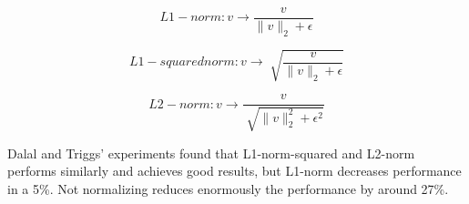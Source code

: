 \begin{equation}\label{eq:L1-norm}
L1-norm: v\rightarrow \frac{v}{    \|v\|_2 + \epsilon}
\end{equation}

\begin{equation}\label{eq:L1-squared}
L1-squared norm: v\rightarrow \sqrt[]{\frac{v}{    \|v\|_2 + \epsilon}}
\end{equation}

\begin{equation}\label{eq:L2-norm}
L2-norm: v\rightarrow \frac{v}{\sqrt[]{    \|v\|_2^2 + \epsilon^2}}
\end{equation}

Dalal and Triggs' experiments found that L1-norm-squared and L2-norm performs similarly and achieves good results, but L1-norm decreases performance in a 5\%. Not normalizing reduces enormously the performance by around 27\%. 







